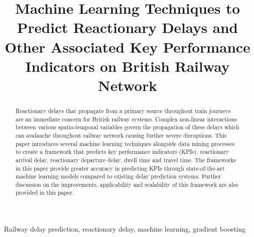 \documentclass[]{interact}
\theoremstyle{plain}%
\theoremstyle{definition}
\theoremstyle{remark}
\begin{document}

\title{Machine Learning Techniques to Predict Reactionary Delays and Other Associated Key Performance Indicators on  British Railway Network}

\author{
}


\maketitle
\newpage
\begin{abstract}
Reactionary delays that propagate from a primary source throughout train journeys are an immediate concern for British railway systems. Complex non-linear interactions between various spatio-temporal variables govern the propagation of these delays which can avalanche throughout railway network causing further severe disruptions. This paper introduces several machine learning techniques alongside data mining processes to create a framework that predicts key performance indicators (KPIs), reactionary arrival delay, reactionary departure delay, dwell time and travel time. The frameworks in this paper provide greater accuracy in predicting KPIs through state-of-the-art machine learning models compared to existing delay prediction systems. Further discussion on the improvements, applicability and scalability of this framework are also provided in this paper. 
\end{abstract}

\begin{keywords}
Railway delay prediction, reactionary delay, machine learning, gradient boosting

\end{keywords}
\end{document}
